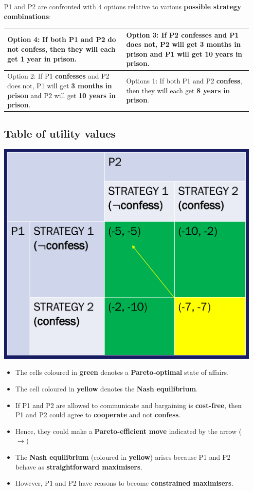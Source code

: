 \documentclass[11pt]{article}
\begin{document}
P1 and P2 are confronted with 4 options relative to various \textbf{possible strategy combinations}:
\begin{center}
\begin{tabularx}{\textwidth}{|X|X|}
\hline
Option 4: If both P1 and P2 \textbf{do not confess}, then they will each get \textbf{1 year in prison}. & Option 3: If P2 \textbf{confesses} and P1 does not, P2 will get \textbf{3 months in prison} and P1 will get \textbf{10 years in prison}.\\
\hline
Option 2: If P1 \textbf{confesses} and P2 does not, P1 will get \textbf{3 months in prison} and P2 will get \textbf{10 years in prison}. & Options 1: If both P1 and P2 \textbf{confess}, then they will each get \textbf{8 years in prison}.\\
\hline
\end{tabularx}
\end{center}
\subsection{Table of utility values}
\label{sec:org9a36c1f}
\begin{center}
\includegraphics[width=.9\linewidth]{./images/prisoners-dilemma-utility-value-table.png}
\end{center}
\begin{itemize}
\item The cells coloured in \textbf{green} denotes a \textbf{Pareto-optimal} state of affairs.
\item The cell coloured in \textbf{yellow} denotes the \textbf{Nash equilibrium}.
\item If P1 and P2 are allowed to communicate and bargaining is \textbf{cost-free}, then P1 and P2 could agree to \textbf{cooperate} and not \textbf{confess}.
\item Hence, they could make a \textbf{Pareto-efficient move} indicated by the arrow (\(\rightarrow\))
\item The \textbf{Nash equilibrium} (coloured in \textbf{yellow}) arises because P1 and P2 behave as \textbf{straightforward maximisers}.
\item However, P1 and P2 have reasons to become \textbf{constrained maximisers}.
\end{itemize}
\end{document}
